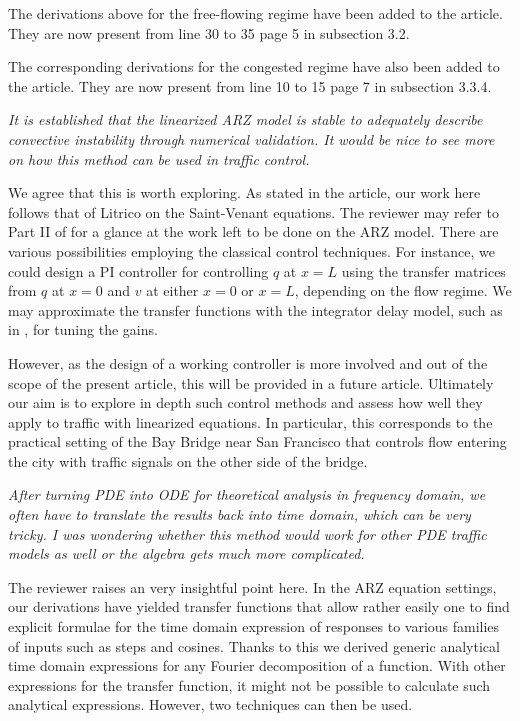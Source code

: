 \documentclass{article}
\begin{document}
The derivations above for the free-flowing regime have been added to the article. They are now present from line 30 to 35 page 5 in subsection 3.2.

The corresponding derivations for the congested regime have also been added to the article. They are now present from line 10 to 15 page 7 in subsection 3.3.4.

\bigskip{}

\emph{
It is established that the linearized ARZ model is stable to adequately describe convective instability through numerical validation. It would be nice to see more on how this method can be used in traffic control.
}

We agree that this is worth exploring. As stated in the article, our work here follows that of Litrico on the Saint-Venant equations. The reviewer may refer to Part II of \cite{Litricobook} for a glance at the work left to be done on the ARZ model. There are various possibilities employing the classical control techniques. For instance, we could design a PI controller for controlling $q$ at $x = L$ using the transfer matrices from $q$ at $x = 0$ and $v$ at either $x = 0$ or $x = L$, depending on the flow regime. We may approximate the transfer functions with the integrator delay model, such as in \cite{Litricosimp}, for tuning the gains. 

However, as the design of a working controller is more involved and out of the scope of the present article, this will be provided in a future article. Ultimately our aim is to explore in depth such control methods and assess how well they apply to traffic with linearized equations. In particular, this corresponds to the practical setting of the Bay Bridge near San Francisco that controls flow entering the city with traffic signals on the other side of the bridge. \\

\bigskip{}

\emph{
After turning PDE into ODE for theoretical analysis in frequency domain, we often have to translate the results back into time domain, which can be very tricky. I was wondering whether this method would work for other PDE traffic models as well or the algebra gets much more complicated.
}

The reviewer raises an very insightful point here. In the ARZ equation settings, our derivations have yielded transfer functions that allow rather easily one to find explicit formulae for the time domain expression of responses to various families of inputs such as steps and cosines. Thanks to this we derived generic analytical time domain expressions for any Fourier decomposition of a function.
With other expressions for the transfer function, it might not be possible to calculate such analytical expressions. However, two techniques can then be used.
\end{document}

